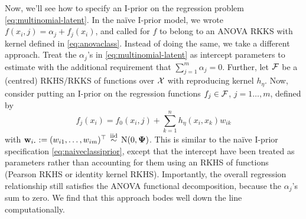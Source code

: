 Now, we'll see how to specify an I-prior on the regression problem \cref{eq:multinomial-latent}.
In the naïve I-prior model, we wrote $f(x_i,j) = \alpha_j + f_j(x_i)$, and called for $f$ to belong to an ANOVA RKKS with kernel defined in \cref{eq:anovaclass}.
Instead of doing the same, we take a different approach.
Treat the $\alpha_j$'s in \cref{eq:multinomial-latent} as intercept parameters to estimate with the additional requirement that $\sum_{j=1}^m \alpha_j = 0$.
Further, let ${\mathcal F}$ be a (centred) RKHS/RKKS of functions over ${\mathcal X}$ with reproducing kernel $h_\eta$.
Now, consider putting an I-prior on the regression functions $f_j \in {\mathcal F}$, $j=1\dots,m$, defined by
\[
  f_j(x_i) = f_0(x_i,j) + \sum_{k=1}^n h_\eta(x_i,x_k)w_{ik}
\]
with $\bw_{i \bigcdot} := (w_{i1},\dots,w_{im})^\top \iid \N(0,\bPsi)$.
This is similar to the naïve I-prior specification \cref{eq:naiveclassiprior}, except that the intercept  have been treated as parameters rather than accounting for them using an RKHS of functions (Pearson RKHS or identity kernel RKHS).
Importantly, the overall regression relationship still satisfies the ANOVA functional decomposition, because the $\alpha_j$'s sum to zero.
We find that this approach bodes well down the line computationally.

